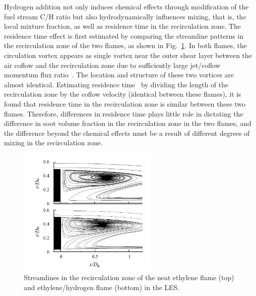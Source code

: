   
Hydrogen addition not only induces chemical effects through modification of the fuel stream C/H ratio but also hydrodynamically influences mixing, that is, the local mixture fraction, as well as residence time in the recirculation zone.  The residence time effect is first estimated by comparing the streamline patterns in the recirculation zone of the two flames, as shown in Fig.~\ref{fig:streamline}.  In both flames, the circulation vortex appears as single vortex near the outer shear layer between the air coflow and the recirculation zone due to sufficiently large jet/coflow momentum flux ratio~\cite{dally98a,dally98b}.  The location and structure of these two vortices are almost identical.  Estimating residence time~\cite{dally96} by dividing the length of the recirculation zone by the coflow velocity (identical between these flames), it is found that residence time in the recirculation zone is similar between these two flames.  Therefore, differences in residence time plays little role in dictating the difference in soot volume fraction in the recirculation zone in the two flames, and the difference beyond the chemical effects must be a result of different degrees of mixing in the recirculation zone.

\begin{figure}[t]
  \centering
  \scriptsize
  \includegraphics[trim=12.0mm 2.0mm 8mm 5mm, clip=true, width=0.6\textwidth]{ch-bluff/streamline.png}
  \normalsize
  \caption{Streamlines in the recirculation zone of the neat ethylene flame (top) and ethylene/hydrogen flame (bottom) in the LES.}
  \label{fig:streamline}
\end{figure}

